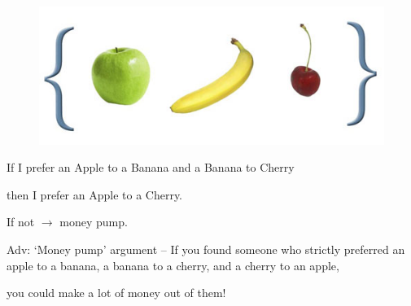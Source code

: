 \documentclass[table]{beamer}
\begin{document}
\begin{frame}

\begin{figure}

{\centering \includegraphics[width=0.5\linewidth]{picsfigs/applebananacherry} 

}

\end{figure}

If I prefer an Apple to a Banana and a Banana to Cherry

then I prefer an Apple to a Cherry.

If not \(\rightarrow\) money pump.

Adv: `Money pump' argument -- If you found someone who strictly
preferred an apple to a banana, a banana to a cherry, and a cherry to an
apple,

you could make a lot of money out of them!

\end{frame}
\end{document}
